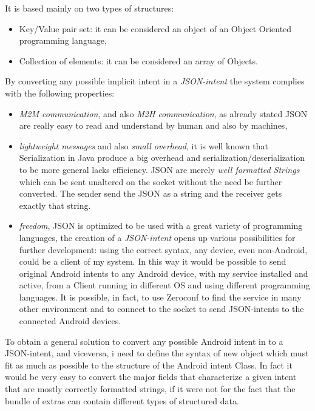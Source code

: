 It is based mainly on two types of structures:
\begin{itemize}
	\item Key/Value pair set: it can be considered an object of an Object Oriented programming language,
	\item Collection of elements: it can be considered an array of Objects.
\end{itemize}
By converting any possible implicit intent in a \textit{JSON-intent} the system complies with the following properties:
\begin{itemize}
	\item \textit{M2M communication}, and also \textit{M2H communication}, as already stated JSON are really easy to read and understand by human and also by machines,
	\item \textit{lightweight messages} and also \textit{small overhead}, it is well known that Serialization in Java produce a big overhead and serialization/deserialization to be more general lacks efficiency. JSON are merely \textit{well formatted Strings} which can be sent unaltered on the socket without the need be further converted. The sender send the JSON as a string and the receiver gets exactly that string.
	\item \textit{freedom}, JSON is optimized to be used with a great variety of programming languages, the creation of a \textit{JSON-intent} opens up various possibilities for further development: using the correct syntax, any device, even non-Android, could be a client of my system. In this way it would be possible to send original Android intents to any Android device, with my service installed and active, from a Client running in different OS and using different programming languages. It is possible, in fact, to use Zeroconf to find the service in many other environment and to connect to the socket to send JSON-intents to the connected Android devices.
\end{itemize}
To obtain a general solution to convert any possible Android intent in to a JSON-intent, and viceversa, i need to define the syntax of new object which must fit as much as possible to the structure of the Android intent Class. In fact it would be very easy to convert the major fields that characterize a given intent that are mostly correctly formatted strings, if it were not for the fact that the bundle of extras can contain different types of structured data.
